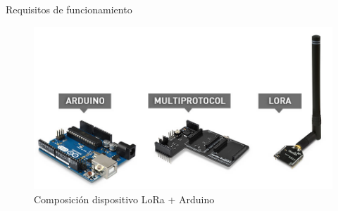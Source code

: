 \documentclass[10pt]{beamer}
\begin{document}
\begin{frame}[fragile]{Requisitos de funcionamiento}
\begin{figure}
\centering\includegraphics[scale=0.3]{imagenes/lora1}\caption{Composición dispositivo LoRa + Arduino}
\end{figure}
\end{frame}
\end{document}
